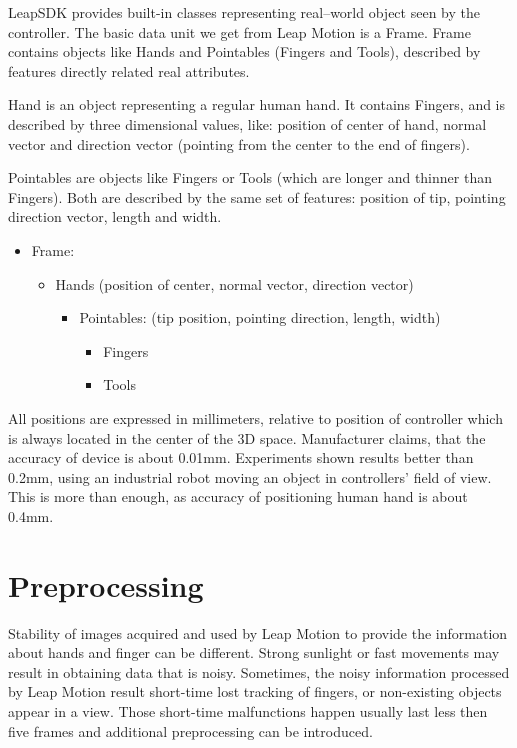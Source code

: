 LeapSDK provides built-in classes representing real--world object seen by the controller. The basic data unit we get from Leap Motion is a Frame. Frame contains objects like Hands and Pointables (Fingers and Tools), described by features directly related real attributes.

Hand is an object representing a regular human hand. It contains Fingers, and is described by three dimensional values, like: position of center of hand, normal vector and direction vector (pointing from the center to the end of fingers). 

Pointables are objects like Fingers or Tools (which are longer and thinner than Fingers). Both are described by the same set of features: position of tip, pointing direction vector, length and width.

\begin{itemize}
	\item Frame:
	\begin{itemize}
		\item Hands (position of center, normal vector, direction vector)
			\begin{itemize}
				\item Pointables: (tip position, pointing direction, length, width)
				\begin{itemize}
					\item Fingers
					\item Tools
				\end{itemize}
			\end{itemize}
	\end{itemize}
\end{itemize}

All positions are expressed in millimeters, relative to position of controller which is always located in the center of the 3D space. Manufacturer claims, that the accuracy of device is about 0.01mm. Experiments shown results better than 0.2mm, using an industrial robot moving an object in controllers' field of view. This is more than enough, as accuracy of positioning human hand is about 0.4mm.~\cite{lmAN} 

\section{Preprocessing} \label{PreprocessingSection}

Stability of images acquired and used by Leap Motion to provide the information about hands and finger can be different.
Strong sunlight or fast movements may result in obtaining data that is noisy.
Sometimes, the noisy information processed by Leap Motion result short-time lost tracking of fingers, or non-existing objects appear in a view. 
Those short-time malfunctions happen usually last less then five frames and additional preprocessing can be introduced. 

